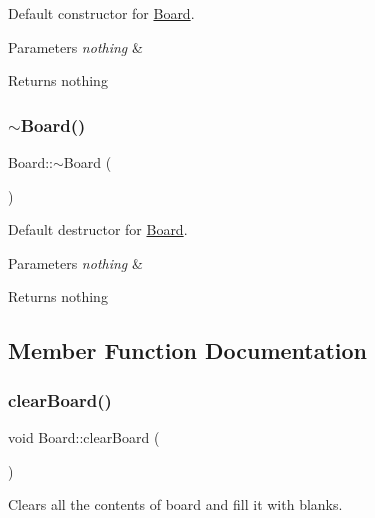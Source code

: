 Default constructor for \mbox{\hyperlink{classBoard}{Board}}. 


\begin{DoxyParams}{Parameters}
{\em nothing} & \\
\hline
\end{DoxyParams}
\begin{DoxyReturn}{Returns}
nothing 
\end{DoxyReturn}
\mbox{\label{classBoard_af73f45730119a1fd8f6670f53f959e68}} 
\subsubsection{\texorpdfstring{$\sim$\+Board()}{~Board()}}
{\footnotesize\ttfamily Board\+::$\sim$\+Board (\begin{DoxyParamCaption}{ }\end{DoxyParamCaption})\hspace{0.3cm}{\ttfamily [virtual]}}



Default destructor for \mbox{\hyperlink{classBoard}{Board}}. 


\begin{DoxyParams}{Parameters}
{\em nothing} & \\
\hline
\end{DoxyParams}
\begin{DoxyReturn}{Returns}
nothing 
\end{DoxyReturn}


\subsection{Member Function Documentation}
\mbox{\label{classBoard_a5f148daa03da25d40dff3fc613568d6f}} 
\subsubsection{\texorpdfstring{clear\+Board()}{clearBoard()}}
{\footnotesize\ttfamily void Board\+::clear\+Board (\begin{DoxyParamCaption}{ }\end{DoxyParamCaption})}



Clears all the contents of board and fill it with blanks. 



